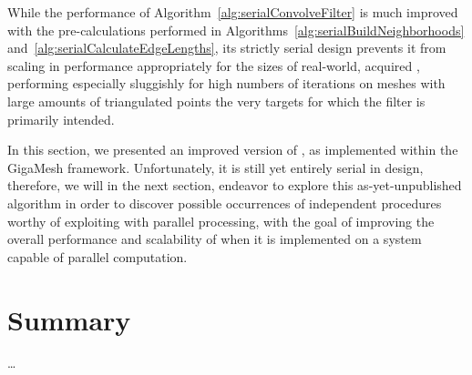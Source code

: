 %
%
%

While the performance of Algorithm~\ref{alg:serialConvolveFilter} is much improved with the pre-calculations performed in Algorithms~\ref{alg:serialBuildNeighborhoods} and~\ref{alg:serialCalculateEdgeLengths}, its strictly serial design prevents it from scaling in performance appropriately for the sizes of real-world, acquired \tdd{}, performing especially sluggishly for high numbers of iterations on meshes with large amounts of triangulated points the very targets for which the filter is primarily intended.

In this section, we presented an improved version of , as implemented within the GigaMesh framework. Unfortunately, it is still yet entirely serial in design, therefore, we will in the next section, endeavor to explore this as-yet-unpublished algorithm in order to discover possible occurrences of independent procedures worthy of exploiting with parallel processing, with the goal of improving the overall performance and scalability of  when it is implemented on a system capable of parallel computation.

%
%
%
%
\section{Summary}
\ldots

